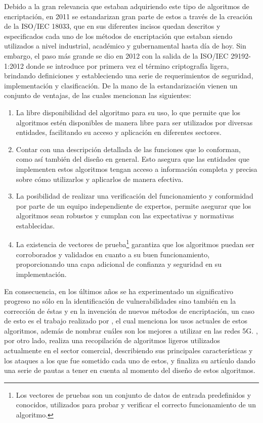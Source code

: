\documentclass[a4paper,10pt]{article}
\begin{document}
	Debido a la gran relevancia que estaban adquiriendo este tipo de algoritmos de encriptación, en 2011 se estandarizan gran parte de estos a través de la creación de la ISO/IEC 18033, que en sus diferentes incisos quedan descritos y especificados cada uno de los métodos de encriptación que estaban siendo utilizados a nivel industrial, académico y gubernamental hasta día de hoy. Sin embargo, el paso más grande se dio en 2012 con la salida de la ISO/IEC 29192-1:2012 donde se introduce por primera vez el término criptografía ligera, brindando definiciones y estableciendo una serie de requerimientos de seguridad, implementación y clasificación. De la mano de la estandarización vienen un conjunto de ventajas, de las cuales \textcite{eterovic15stream} mencionan las siguientes:
	\begin{enumerate}
		\item La libre disponibilidad del algoritmo para su uso, lo que permite que los algoritmos estén disponibles de manera libre para ser utilizados por diversas entidades, facilitando su acceso y aplicación en diferentes sectores.
		\item Contar con una descripción detallada de las funciones que lo conforman, como así también del diseño en general. Esto asegura que las entidades que implementen estos algoritmos tengan acceso a información completa y precisa sobre cómo utilizarlos y aplicarlos de manera efectiva.
		\item La posibilidad de realizar una verificación del funcionamiento y conformidad por parte de un equipo independiente de expertos, permite asegurar que los algoritmos sean robustos y cumplan con las expectativas y normativas establecidas.
		\item La existencia de vectores de prueba\footnote{Los vectores de pruebas son un conjunto de datos de entrada predefinidos y conocidos, utilizados para probar y verificar el correcto funcionamiento de un algoritmo.} garantiza que los algoritmos puedan ser corroborados y validados en cuanto a su buen funcionamiento, proporcionando una capa adicional de confianza y seguridad en su implementación.
	\end{enumerate}
	
	En consecuencia, en los últimos años se ha experimentado un significativo progreso no sólo en la identificación de vulnerabilidades sino también en la corrección de éstas y en la invención de nuevos métodos de encriptación, un caso de esto es el trabajo realizado por \textcite{gunathilake2019next}, el cual menciona los usos actuales de estos algoritmos, además de nombrar cuáles son los mejores a utilizar en las redes 5G. \textcite{eterovic2019criptografia}, por otro lado, realiza una recopilación de algoritmos ligeros utilizados actualmente en el sector comercial, describiendo sus principales características y los ataques a los que fue sometido cada uno de estos, y finaliza su artículo dando una serie de pautas a tener en cuenta al momento del diseño de estos algoritmos.
	
\end{document}
